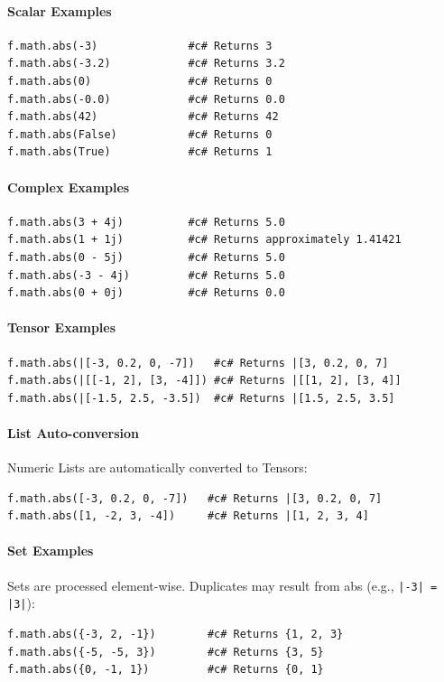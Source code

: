 \paragraph{Scalar Examples}
\begin{verbatim}
f.math.abs(-3)              #c# Returns 3
f.math.abs(-3.2)            #c# Returns 3.2
f.math.abs(0)               #c# Returns 0
f.math.abs(-0.0)            #c# Returns 0.0
f.math.abs(42)              #c# Returns 42
f.math.abs(False)           #c# Returns 0
f.math.abs(True)            #c# Returns 1
\end{verbatim}

\paragraph{Complex Examples}
\begin{verbatim}
f.math.abs(3 + 4j)          #c# Returns 5.0
f.math.abs(1 + 1j)          #c# Returns approximately 1.41421
f.math.abs(0 - 5j)          #c# Returns 5.0
f.math.abs(-3 - 4j)         #c# Returns 5.0
f.math.abs(0 + 0j)          #c# Returns 0.0
\end{verbatim}

\paragraph{Tensor Examples}
\begin{verbatim}
f.math.abs(|[-3, 0.2, 0, -7])   #c# Returns |[3, 0.2, 0, 7]
f.math.abs(|[[-1, 2], [3, -4]]) #c# Returns |[[1, 2], [3, 4]]
f.math.abs(|[-1.5, 2.5, -3.5])  #c# Returns |[1.5, 2.5, 3.5]
\end{verbatim}

\paragraph{List Auto-conversion}
Numeric Lists are automatically converted to Tensors:
\begin{verbatim}
f.math.abs([-3, 0.2, 0, -7])   #c# Returns |[3, 0.2, 0, 7]
f.math.abs([1, -2, 3, -4])     #c# Returns |[1, 2, 3, 4]
\end{verbatim}

\paragraph{Set Examples}
Sets are processed element-wise. Duplicates may result from abs (e.g., \texttt{|-3| = |3|}):
\begin{verbatim}
f.math.abs({-3, 2, -1})        #c# Returns {1, 2, 3}
f.math.abs({-5, -5, 3})        #c# Returns {3, 5}
f.math.abs({0, -1, 1})         #c# Returns {0, 1}
\end{verbatim}


